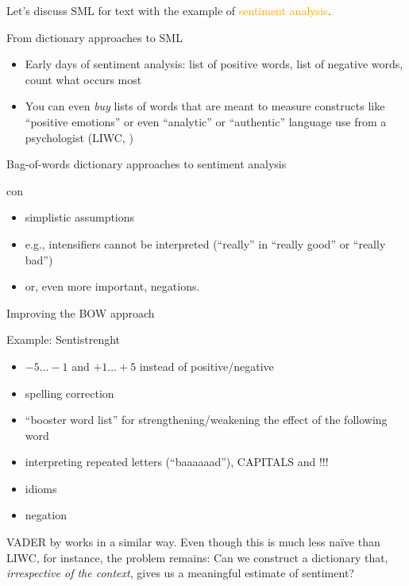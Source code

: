 \begin{frame}[standout]
Let's discuss SML for text with the example of \textcolor{orange}{sentiment analysis}.
\end{frame}


\begin{frame}{From dictionary approaches to SML}
  \begin{itemize}[<+->]
  \item Early days of sentiment analysis: list of positive words, list of negative words, count what occurs most
  \item You can even \textit{buy} lists of words that are meant to measure constructs like ``positive emotions'' or even ``analytic'' or ``authentic'' language use from a psychologist (LIWC, \cite{Pennebaker2007})
  \end{itemize}
\end{frame}




\begin{frame}{Bag-of-words dictionary approaches to sentiment analysis}
  \begin{block}{con}
    \begin{itemize}
    \item simplistic assumptions
    \item e.g., intensifiers cannot be interpreted (``really'' in ``really good'' or ``really bad'')
    \item or, even more important, negations.
    \end{itemize}
  \end{block}
\end{frame}




\begin{frame}{Improving the BOW approach}
  \begin{block}{Example: Sentistrenght \parencite{Thelwall2012}}
    \begin{itemize}
    \item $-5\ldots-1$ and $+1\ldots+5$ instead of positive/negative
    \item spelling correction
    \item ``booster word list'' for strengthening/weakening the effect of the following word
    \item interpreting repeated letters (``baaaaaad''), CAPITALS and !!!
    \item idioms
    \item negation 
    \end{itemize}
	\end{block}
	VADER by \cite{Hutto2014} works in a similar way.
	\pause
	\footnotesize{Even though this is much less na\"ive than LIWC, for instance, the problem remains: Can we construct a dictionary that, \emph{irrespective of the context}, gives us a meaningful estimate of sentiment? }
\end{frame}





